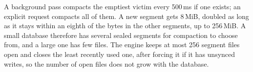 A background pass compacts the emptiest victim every 500\,ms if one exists; an explicit request compacts all of them. A new segment gets 8\,MiB, doubled as long as it stays within an eighth of the bytes in the other segments, up to 256\,MiB. A small database therefore has several sealed segments for compaction to choose from, and a large one has few files. The engine keeps at most 256 segment files open and closes the least recently used one, after forcing it if it has unsynced writes, so the number of open files does not grow with the database.

